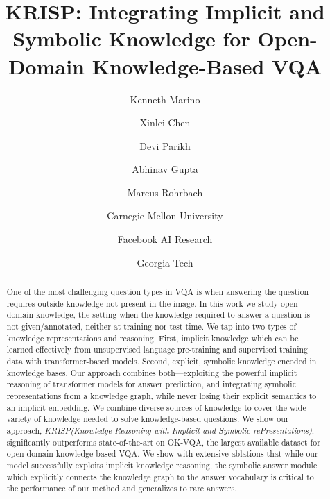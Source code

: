 \documentclass[final]{cvpr}
\providecommand{\ModelName}{KRISP\xspace}
\providecommand{\ModelNameLong}{Knowledge Reasoning with Implicit and  Symbolic rePresentations\xspace}
\providecommand{\sectionvspace}{\vspace{-0cm}}
\begin{document}
\title{KRISP: Integrating Implicit and Symbolic Knowledge for Open-Domain Knowledge-Based VQA}

\author{Kenneth Marino \hspace{-.4cm} \\
\and
Xinlei Chen \hspace{-.4cm} \\
\and
Devi Parikh \hspace{-.4cm}\\
\and
Abhinav Gupta \hspace{-.4cm}\\
\and
Marcus Rohrbach\\
\and
Carnegie Mellon University
\and
Facebook AI Research
\and
Georgia Tech
}
\maketitle

\begin{abstract}
    One of the most challenging question types in VQA is when  answering the question requires outside knowledge not present in the image. In this work we study open-domain knowledge, the setting when the knowledge required to answer a question is not given/annotated, neither at training nor test time. We tap into two types of knowledge representations and reasoning. First, implicit knowledge which can be learned effectively from unsupervised language pre-training and supervised training data with transformer-based models. Second, explicit, symbolic knowledge encoded in knowledge bases. Our approach combines both---exploiting the powerful implicit reasoning of transformer models for answer prediction, and integrating symbolic representations from a knowledge graph, while never losing their explicit semantics to an implicit embedding. We combine diverse sources of knowledge to cover the wide variety of knowledge needed to solve knowledge-based questions. We show our approach, \emph{\ModelName (\ModelNameLong)}, significantly outperforms state-of-the-art on OK-VQA, the largest available dataset for open-domain knowledge-based VQA. We show with extensive ablations that while our model successfully exploits implicit knowledge reasoning, the symbolic answer module which explicitly connects the knowledge graph to the answer vocabulary is critical to the performance of our method and generalizes to rare answers.
\end{abstract}


\vspace{-.3cm}
\sectionvspace
\end{document}
